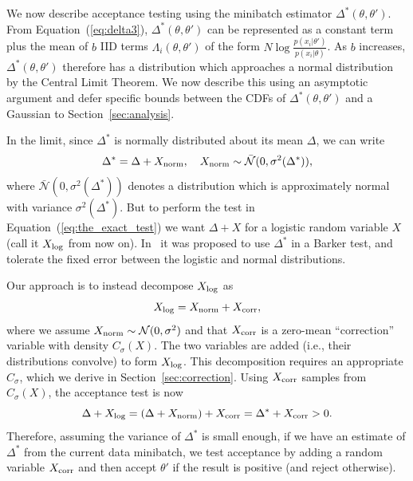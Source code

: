 \documentclass{article}
\begin{document}
We now describe acceptance testing using the minibatch estimator
$\Delta^*(\theta,\theta')$. From Equation~(\ref{eq:delta3}),
$\Delta^*(\theta,\theta')$ can be represented as a constant term plus the mean
of $b$ IID terms $\Lambda_i(\theta,\theta')$ of the form
$N\log\frac{p(x_i|\theta')}{p(x_i|\theta)}$. As $b$ increases,
$\Delta^*(\theta,\theta')$ therefore has a distribution which approaches a
normal distribution by the Central Limit Theorem. We now describe this using an
asymptotic argument and defer specific bounds between the CDFs of
$\Delta^*(\theta,\theta')$ and a Gaussian to Section~\ref{sec:analysis}.

In the limit, since $\Delta^*$ is normally distributed about its mean $\Delta$,
we can write
\begin{equation}\label{eq:relationship}
    \Delta^* = \Delta + X_{\rm norm}, \quad X_{\rm norm} \sim \mathcal{\bar{N}}(0, \sigma^2(\Delta^*)),
\end{equation}
where $\mathcal{\bar{N}}(0, \sigma^2(\Delta^*))$ denotes a distribution which is
approximately normal with variance $\sigma^2(\Delta^*)$.  But to perform the
test in Equation~(\ref{eq:the_exact_test}) we want $\Delta + X$ for a logistic
random variable $X$ (call it $X_{\rm log}$ from now on). In~\cite{TallData15} it
was proposed to use $\Delta^*$ in a Barker test, and tolerate the fixed
error between the logistic and normal distributions. 

Our approach is to instead decompose $X_{\rm log}$ as
\begin{equation}\label{eq:deconvolution}
    X_{\rm log} = X_{\rm norm}+X_{\rm corr},
\end{equation}
where we assume $X_{\rm norm} \sim \mathcal{N}(0, \sigma^2)$ and that $X_{\rm
corr}$ is a zero-mean ``correction'' variable with density $C_{\sigma}(X)$.  The
two variables are added (i.e., their distributions convolve) to form $X_{\rm
log}$.  This decomposition requires an appropriate $C_\sigma$, which we derive
in Section~\ref{sec:correction}. Using $X_{\rm corr}$ samples from
$C_{\sigma}(X)$, the acceptance test is now
\begin{equation}\label{eq:criteria}
    \Delta + X_{\rm log} = (\Delta + X_{\rm norm}) + X_{\rm corr} = \Delta^* + X_{\rm corr} >0.
\end{equation}
Therefore, assuming the variance of $\Delta^*$ is small enough, if we have an
estimate of $\Delta^*$ from the current data minibatch, we test acceptance by
adding a random variable $X_{\rm corr}$ and then accept $\theta'$ if the result
is positive (and reject otherwise).
\end{document}
